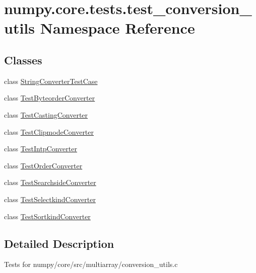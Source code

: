 \hypertarget{namespacenumpy_1_1core_1_1tests_1_1test__conversion__utils}{}\section{numpy.\+core.\+tests.\+test\+\_\+conversion\+\_\+utils Namespace Reference}
\label{namespacenumpy_1_1core_1_1tests_1_1test__conversion__utils}
\subsection*{Classes}
\begin{DoxyCompactItemize}
\item 
class \hyperlink{classnumpy_1_1core_1_1tests_1_1test__conversion__utils_1_1StringConverterTestCase}{String\+Converter\+Test\+Case}
\item 
class \hyperlink{classnumpy_1_1core_1_1tests_1_1test__conversion__utils_1_1TestByteorderConverter}{Test\+Byteorder\+Converter}
\item 
class \hyperlink{classnumpy_1_1core_1_1tests_1_1test__conversion__utils_1_1TestCastingConverter}{Test\+Casting\+Converter}
\item 
class \hyperlink{classnumpy_1_1core_1_1tests_1_1test__conversion__utils_1_1TestClipmodeConverter}{Test\+Clipmode\+Converter}
\item 
class \hyperlink{classnumpy_1_1core_1_1tests_1_1test__conversion__utils_1_1TestIntpConverter}{Test\+Intp\+Converter}
\item 
class \hyperlink{classnumpy_1_1core_1_1tests_1_1test__conversion__utils_1_1TestOrderConverter}{Test\+Order\+Converter}
\item 
class \hyperlink{classnumpy_1_1core_1_1tests_1_1test__conversion__utils_1_1TestSearchsideConverter}{Test\+Searchside\+Converter}
\item 
class \hyperlink{classnumpy_1_1core_1_1tests_1_1test__conversion__utils_1_1TestSelectkindConverter}{Test\+Selectkind\+Converter}
\item 
class \hyperlink{classnumpy_1_1core_1_1tests_1_1test__conversion__utils_1_1TestSortkindConverter}{Test\+Sortkind\+Converter}
\end{DoxyCompactItemize}


\subsection{Detailed Description}
\begin{DoxyVerb}Tests for numpy/core/src/multiarray/conversion_utils.c
\end{DoxyVerb}
 